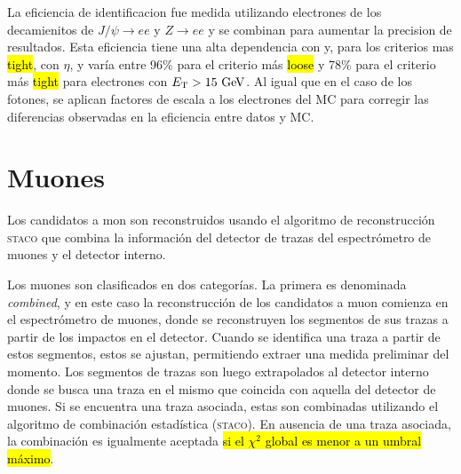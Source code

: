 La eficiencia de identificacion fue medida utilizando electrones de los
decamienitos de $J/\psi\to ee$ y $Z\to ee$ y se combinan para aumentar la
precision de resultados. Esta eficiencia tiene una alta dependencia con {\et} y, para
los criterios mas \hl{tight}, con $\eta$, y varía entre 96\% para el criterio
más \hl{loose} y 78\% para el criterio más \hl{tight} para electrones con $\et>15\gev$.
Al igual que en el caso de los fotones, se aplican factores de escala
a los electrones del MC para corregir las diferencias observadas en la
eficiencia entre datos y MC.



\section{Muones}
\label{sec:muon_obj}

Los candidatos a mon son reconstruidos usando el algoritmo de reconstrucción
\textsc{staco}\cite{ATLAS_TDR1} que combina la información del detector de
trazas del espectrómetro de muones y el detector interno.

Los muones son clasificados en dos categorías. La primera es denominada
\emph{combined}, y en este caso la reconstrucción de los candidatos a muon
comienza en el espectrómetro de muones, donde se reconstruyen
los segmentos de sus trazas a partir de los impactos en el detector.
Cuando se identifica una traza a partir de estos segmentos, estos se ajustan,
permitiendo extraer una medida preliminar del momento. Los segmentos de trazas
son luego extrapolados al detector interno donde se busca una traza en el mismo
que coincida con aquella del detector de muones.
Si se encuentra una traza asociada, estas son combinadas utilizando el algoritmo
de combinación estadística (\textsc{staco}). En ausencia de una traza asociada,
la combinación es igualmente aceptada \hl{si el $\chi^2$ global es menor a un umbral
máximo}.

